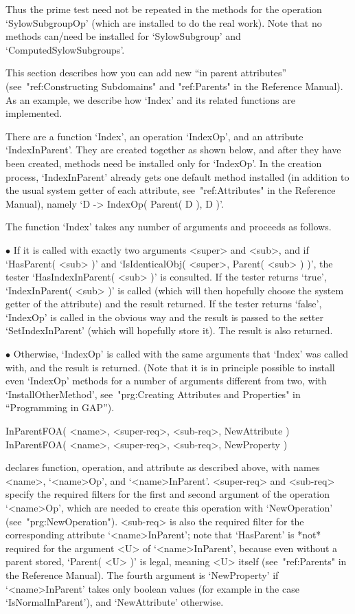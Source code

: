 Thus the prime test need not be repeated in the methods for the operation
`SylowSubgroupOp' (which are installed to do the real work).
Note that no methods can/need be installed for `SylowSubgroup' and
`ComputedSylowSubgroups'.



This section describes how you can add  new ``in parent attributes''
(see~"ref:Constructing Subdomains" and "ref:Parents" in the Reference Manual).
As an example, we describe how `Index' and its related functions
are implemented.

There are a function `Index', an operation `IndexOp', and an attribute
`IndexInParent'.
They are created together as shown below,
and after they have been created,
methods need be installed only for `IndexOp'.
In the creation process, `IndexInParent' already gets one default method
installed
(in addition to the usual system getter of each attribute,
see~"ref:Attributes" in the Reference Manual),
namely `D -> IndexOp( Parent( D ), D )'.

The function `Index' takes any number of arguments and proceeds as
follows.
\beginlist
\item{$\bullet$}
  If it is called  with exactly two arguments  <super> and <sub>,  and if
  `HasParent( <sub> )' and  `IsIdenticalObj( <super>, Parent( <sub> ) )',
  the tester `HasIndexInParent( <sub> )' is consulted.
  \itemitem{$\circ$}
    If  the  tester returns `true',  `IndexInParent(  <sub> )'  is called
    (which will then hopefully choose the system getter of the attribute)
    and the result returned.
  \itemitem{$\circ$}
    If the tester returns `false', `IndexOp' is called in the obvious way
    and the result is passed to the setter `SetIndexInParent' (which will
    hopefully store it). The result is also returned.
\item{$\bullet$}
  Otherwise, `IndexOp' is called with the same arguments that `Index' was
  called with, and the result is returned.
  (Note that it is in principle possible to install even `IndexOp' methods
  for a number of arguments different from two, with `InstallOtherMethod',
  see~"prg:Creating Attributes and Properties" in ``Programming in GAP'').
\endlist

\>InParentFOA( <name>, <super-req>, <sub-req>, NewAttribute )
\>InParentFOA( <name>, <super-req>, <sub-req>, NewProperty )

declares function, operation, and attribute as described above,
with names <name>, `<name>Op', and `<name>InParent'.
<super-req> and <sub-req> specify the required filters for the first and
second argument of the operation `<name>Op',
which are needed to create this operation with `NewOperation'
(see~"prg:NewOperation").
<sub-req> is also the required filter for the corresponding attribute
`<name>InParent';
note that `HasParent' is *not* required for the argument <U> of
`<name>InParent', because even without a parent stored,
`Parent( <U> )' is legal, meaning <U> itself
(see~"ref:Parents" in the Reference Manual).
The fourth argument is `NewProperty' if `<name>InParent' takes only
boolean values (for example in the case `IsNormalInParent'),
and `NewAttribute' otherwise.


